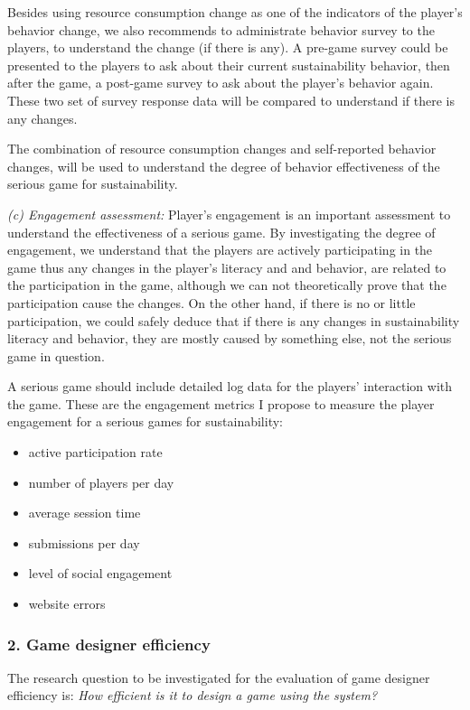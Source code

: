 \documentclass{sigchi}
\begin{document}
Besides using resource consumption change as one of the indicators of the player's behavior change, we also recommends to administrate behavior survey to the players, to understand the change (if there is any). A pre-game survey could be presented to the players to ask about their current sustainability behavior, then after the game, a post-game survey to ask about the player's behavior again. These two set of survey response data will be compared to understand if there is any changes.

The combination of resource consumption changes and self-reported behavior changes, will be used to understand the degree of behavior effectiveness of the serious game for sustainability.

\emph {(c) Engagement assessment:}
Player's engagement is an important assessment to understand the effectiveness of a serious game. By investigating the degree of engagement, we understand that the players are actively participating in the game thus any changes in the player's literacy and and behavior, are related to the participation in the game, although we can not theoretically prove that the participation cause the changes. On the other hand, if there is no or little participation, we could safely deduce that if there is any changes in sustainability literacy and behavior, they are mostly caused by something else, not the serious game in question.

A serious game should include detailed log data for the players' interaction with the game. These are the engagement metrics I propose to measure the player engagement for a serious games for sustainability:

\begin{itemize}
\item active participation rate
\item number of players per day
\item average session time
\item submissions per day
\item level of social engagement
\item website errors
\end{itemize}

\subsubsection{2. Game designer efficiency}
The research question to be investigated for the evaluation of game designer efficiency is: \emph{How efficient is it to design a game using the system?}
\end{document}
